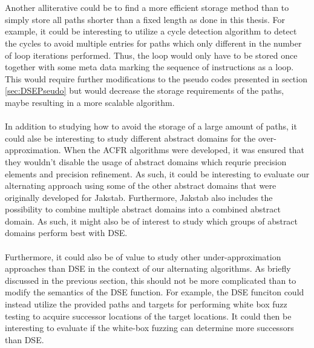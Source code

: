\documentclass{kththesis}
\begin{document}
\\ \\
Another alliterative could be to find a more efficient storage method than to simply store all paths shorter than a fixed length as done in this thesis. For example, it could be interesting to utilize a cycle detection algorithm to detect the cycles to avoid multiple entries for paths which only different in the number of loop iterations performed. Thus, the loop would only have to be stored once together with some meta data marking the sequence of instructions as a loop. This would require further modifications to the pseudo codes presented in section \ref{sec:DSEPseudo} but would decrease the storage requirements of the paths, maybe resulting in a more scalable algorithm.
\\ \\
In addition to studying how to avoid the storage of a large amount of paths, it could alse be interesting to study different abstract domains for the over-approximation. When the ACFR algorithms were developed, it was ensured that they wouldn't disable the usage of abstract domains which requrie precision elements and precision refinement. As such, it could be interesting to evaluate our alternating approach using some of the other abstract domains that were originally developed for Jakstab. Furthermore, Jakstab also includes the possibility to combine multiple abstract domains into a combined abstract domain. As such, it might also be of interest to study which groups of abstract domains perform best  with DSE.
\\ \\
Furthermore, it could also be of value to study other under-approximation approaches than DSE in the context of our alternating algorithms. As briefly discussed in the previous section, this should not be more complicated than to modify the semantics of the DSE function. For example, the DSE funciton could instead utilize the provided paths and targets for performing white box fuzz testing\cite{automatedFuzzing} to acquire successor locations of the target locations. It could then be interesting to evaluate if the white-box fuzzing can determine more successors than DSE.

\begin{otherlanguage}{australian}%
\printbibliography[heading=bibintoc]
\end{otherlanguage}
\end{document}
